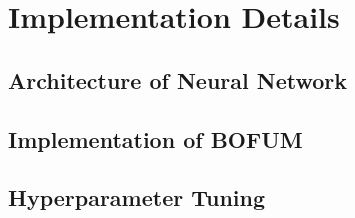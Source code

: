 \chapter{Implementation Details}

\section{Architecture of Neural Network}

\section{Implementation of BOFUM}

\section{Hyperparameter Tuning}

